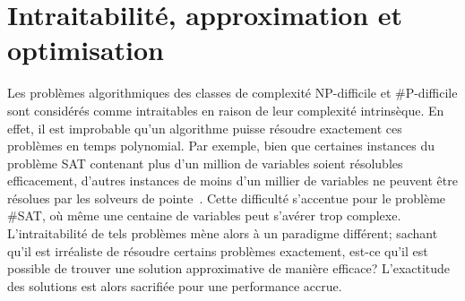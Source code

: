 
\section{Intraitabilité, approximation et optimisation}
\label{sec:intractabilite-approximation-et-optimisation}

Les problèmes algorithmiques des classes de complexité \textsf{NP}-difficile et \textsf{\#P}-difficile sont considérés comme intraitables en raison de leur complexité intrinsèque. En effet, il est improbable qu'un algorithme puisse résoudre exactement ces problèmes en temps polynomial. Par exemple, bien que certaines instances du problème SAT contenant plus d'un million de variables soient résolubles efficacement, d'autres instances de moins d'un millier de variables ne peuvent être résolues par les solveurs de pointe~\cite{froleyksSATCompetition20202021}. Cette difficulté s'accentue pour le problème \#SAT, où même une centaine de variables peut s'avérer trop complexe. L'intraitabilité de tels problèmes mène alors à un paradigme différent; sachant qu'il est irréaliste de résoudre certains problèmes exactement, est-ce qu'il est possible de trouver une solution approximative de manière efficace? L'exactitude des solutions est alors sacrifiée pour une performance accrue.

